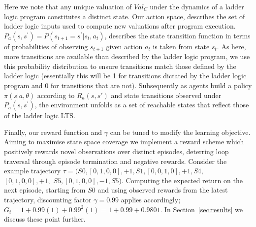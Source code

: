 \documentclass[runningheads]{llncs}
\begin{document}
Here we note that any unique valuation of $Val_C$ under the dynamics of a ladder logic program constitutes a distinct state. Our action space, describes the set of ladder logic inputs used to compute new valuations after program execution. $P_a(s,s^\prime) = P(s_{t+1} = s^\prime | s_t, a_t)$, describes the state transition function in terms of probabilities of observing $s_{t+1}$ given action $a_t$ is taken from state $s_t$. As here, more transitions are available than described by the ladder logic program, we use this probability distribution to ensure transitions match those defined by the ladder logic (essentially this will be 1 for transitions dictated by the ladder logic program and 0 for transitions that are not). Subsequently as agents build a policy $\pi(s|a,\theta)$ according to $R_a(s,s')$ and state transitions observed under $P_a(s,s^\prime)$, the environment unfolds as a set of reachable states that reflect those of the ladder logic LTS. 


Finally, our reward function and $\gamma$ can be tuned to modify the learning objective. Aiming to maximise state space coverage we implement a reward scheme which positively rewards novel observations over distinct episodes, deterring loop traversal through episode termination and negative rewards. Consider the example trajectory $\tau =(S0, [0,1,0,0], + 1, S1, [0,0,1,0], + 1, S4,$ $[0,1,0,0], + 1,$ $S5, [0,1,0,0], -1, S5)$. Computing the expected return on the next episode, starting from $S0$ and using observed rewards from the latest trajectory, discounting factor $\gamma = 0.99$ applies accordingly; $G_t = 1 + 0.99(1) + 0.99^{2}(1) = 1 + 0.99 + 0.9801$.  In Section~\ref{sec:results} we discuss these point further.
\end{document}
